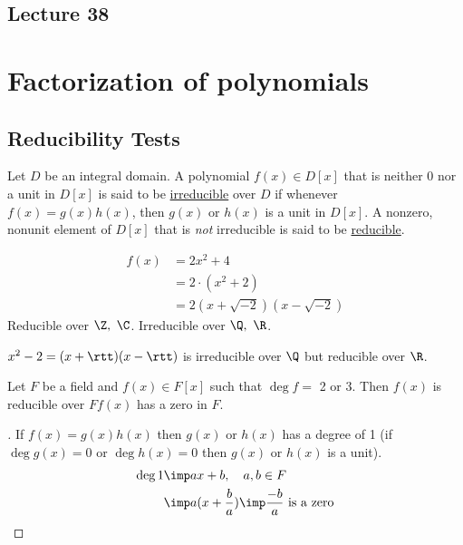 \documentclass[a4paper]{article}
\begin{document}
\subsection*{Lecture 38} %
\section{Factorization of polynomials}
\subsection{Reducibility Tests}
\begin{definition}
  Let \( D \) be an integral domain. A polynomial \( f(x)\in D[x] \) that is neither 0 nor a unit in \( D[x] \) is said to be \ul{irreducible} over \( D \) if whenever \( f(x) = g(x)h(x) \), then \( g(x) \) or \( h(x) \) is a unit in \( D[x] \). A nonzero, nonunit element of \( D[x] \) that is \emph{not} irreducible is said to be \ul{reducible}.
\end{definition}

\begin{example}
  \begin{align*}
    f(x) &= 2x^2 + 4 \\ &= 2\cdot (x^2+2) \\ &= 2(x+\sqrt{-2})(x-\sqrt{-2})
  \end{align*}
  Reducible over \( \Z,\ \C \). Irreducible over \( \Q,\ \R \).
\end{example}

\begin{example}
  \( x^2-2 = (x+\rtt)(x-\rtt) \) is irreducible over \( \Q \) but reducible over \( \R \).
\end{example}

\begin{theorem}
  Let \( F \) be a field and \( f(x) \in F[x] \) such that \( \deg f =\) 2 or 3. Then \( f(x) \) is reducible over \( F \)\iff \( f(x) \) has a zero in \( F \).
\end{theorem}

\begin{proof}[]
  If \( f(x) = g(x)h(x) \) then \( g(x) \) or \( h(x) \) has a degree of 1 (if \( \deg g(x) = 0 \) or \( \deg h(x) = 0 \) then \( g(x) \) or \( h(x) \) is a unit).
  \begin{align*}
    \deg 1 &\imp ax+b,\quad a,b\in F \\ &\imp a(x+\frac{b}{a}) \imp \frac{-b}{a} \text{ is a zero}
  \end{align*}
\end{proof}
\end{document}
